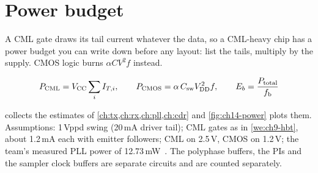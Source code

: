 \section{Power budget}\label{sec:power-budget}

A CML gate draws its tail current whatever the data, so a CML-heavy chip has a power budget you can write down before any layout: list the tails, multiply by the supply. CMOS logic burns $\alpha C V^2 f$ instead.

\begin{keyeq}
\begin{equation}
  P_\mathrm{CML} = V_\mathrm{CC}\sum_i I_{T,i},\qquad P_\mathrm{CMOS}=\alpha\,C_\mathrm{sw}V_\mathrm{DD}^2f,\qquad E_b = \frac{P_\mathrm{total}}{f_\mathrm{b}}
  \label{eq:ch14-eb}
\end{equation}
\end{keyeq}

 collects the estimates of \cref{ch:tx,ch:rx,ch:pll,ch:cdr} and \cref{fig:ch14-power} plots them. Assumptions: 1\,Vppd swing (20\,mA driver tail); CML gates as in \cref{we:ch9-hbt}, about 1.2\,mA each with emitter followers; CML on 2.5\,V, CMOS on 1.2\,V; the team's measured PLL power of 12.73\,mW~\cite{smacd2026pll}. The polyphase buffers, the PIs and the sampler clock buffers are separate circuits and are counted separately.

